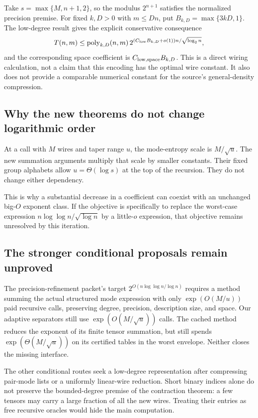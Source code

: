 Take $s=\max\{M,n+1,2\}$, so the modulus $2^{n+1}$ satisfies the
normalized precision premise. For fixed $k,D>0$ with $m\le Dn$,
put $B_{k,D}=\max\{3kD,1\}$. The low-degree result gives the explicit
conservative consequence
\[
 T(n,m)\le\operatorname{poly}_{k,D}(n,m)\,
 2^{(C_{\rm low}B_{k,D}+o(1))n/\sqrt{\log_2n}},
\]
and the corresponding space coefficient is
$C_{\rm low,space}B_{k,D}$. This is a direct wiring calculation,
not a claim that this encoding has the optimal wire constant.
It also does not provide a comparable numerical constant for the
source's general-density compression.

\subsection{Why the new theorems do not change logarithmic order}

At a call with $M$ wires and taper range $u$, the mode-entropy scale
is $M/\sqrt u$. The new summation arguments multiply that scale by
smaller constants. Their fixed group alphabets allow $u=\Theta(\log s)$
at the top of the recursion. They do not change either dependency.

This is why a substantial decrease in a coefficient can coexist with
an unchanged big-$O$ exponent class. If the objective is specifically
to replace the worst-case expression
$n\log\log n/\sqrt{\log n}$ by a little-$o$ expression, that objective
remains unresolved by this iteration.

\subsection{The stronger conditional proposals remain unproved}

The precision-refinement packet's target
$2^{O(n\log\log n/\log n)}$ requires a method summing the actual
structured mode expression with only $\exp(O(M/u))$ paid recursive
calls, preserving degree, precision, description size, and space.
Our adaptive separators still use $\exp(O(M/\sqrt u))$ calls.
The cached method reduces the exponent of its finite tensor summation,
but still spends $\exp(\Theta(M/\sqrt u))$ on its certified tables
in the worst envelope. Neither closes the missing interface.

The other conditional routes seek a low-degree representation after
compressing pair-mode lists or a uniformly linear-wire reduction.
Short binary indices alone do not preserve the bounded-degree
premise of the contraction theorem: a few tensors may carry a
large fraction of all the new wires. Treating their entries as
free recursive oracles would hide the main computation.

